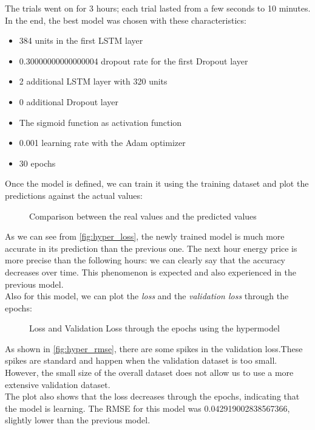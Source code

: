 The trials went on for 3 hours; each trial lasted from a few seconds to 10 minutes. In the end, the best model was chosen with these characteristics:
\begin{itemize}
    \item 384 units in the first LSTM layer
    \item 0.30000000000000004 dropout rate for the first Dropout layer
    \item 2 additional LSTM layer with 320 units
    \item 0 additional Dropout layer
    \item The sigmoid function as activation function
    \item 0.001 learning rate with the Adam optimizer
    \item 30 epochs
\end{itemize}
Once the model is defined, we can train it using the training dataset and plot the predictions against the actual values:
\begin{figure}[H]
    \centering
    
    \caption{Comparison between the real values and the predicted values}
    \label{fig:hyper_loss}
\end{figure}
As we can see from \autoref{fig:hyper_loss}, the newly trained model is much more accurate in its prediction than the previous one. The next hour energy price is more precise than the following hours: we can clearly say that the accuracy decreases over time. This phenomenon is expected and also experienced in the previous model. \\
Also for this model, we can plot the \textit{loss} and the \textit{validation loss} through the epochs:
\begin{figure}[H]
    \centering
    
    \caption{Loss and Validation Loss through the epochs using the hypermodel}
    \label{fig:hyper_rmse}
\end{figure}
As shown in \autoref{fig:hyper_rmse}, there are some spikes in the validation loss.These spikes are standard and happen when the validation dataset is too small. However, the small size of the overall dataset does not allow us to use a more extensive validation dataset.  \\
The plot also shows that the loss decreases through the epochs, indicating that the model is learning. The RMSE for this model was 0.042919002838567366, slightly lower than the previous model. \\ 
